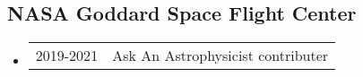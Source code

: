 \subsection*{NASA Goddard Space Flight Center}
\begin{itemize}
\item \begin{tabular}{ll}
2019-2021 & Ask An Astrophysicist contributer
\end{tabular}
\end{itemize}





\bigskip



